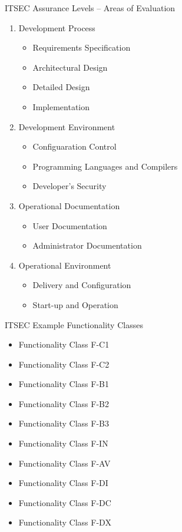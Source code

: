 \documentclass[xcolor=dvipsname,t]{beamer}
\begin{document}
\begin{frame} {ITSEC Assurance Levels -- Areas of Evaluation}
    \begin{enumerate}
        \item Development Process
            \begin{itemize}
                \item Requirements Specification
                \item Architectural Design
                \item Detailed Design
                \item Implementation
            \end{itemize}
        \item Development Environment
            \begin{itemize}
                \item Configuaration Control
                \item Programming Languages and Compilers
                \item Developer's Security
            \end{itemize}
        \item Operational Documentation
            \begin{itemize}
                \item User Documentation
                \item Administrator Documentation
            \end{itemize}
        \item Operational Environment
            \begin{itemize}
                \item Delivery and Configuration
                \item Start-up and Operation
            \end{itemize}
    \end{enumerate}
\end{frame}

\begin{frame} {ITSEC Example Functionality Classes}
    \begin{itemize}
        \item Functionality Class F-C1
        \item Functionality Class F-C2
        \item Functionality Class F-B1
        \item Functionality Class F-B2
        \item Functionality Class F-B3
        \item Functionality Class F-IN
        \item Functionality Class F-AV
        \item Functionality Class F-DI
        \item Functionality Class F-DC
        \item Functionality Class F-DX
    \end{itemize}
\end{frame}
\end{document}
